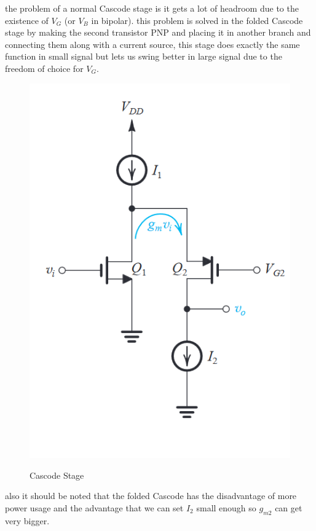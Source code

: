 \documentclass[11pt]{article}
\begin{document}
the problem of a normal Cascode stage is it gets a lot of headroom due to the existence of
$V_G$ (or $V_B$ in bipolar). this problem is solved in the folded Cascode stage by
making the second transistor PNP and placing it in another branch and connecting
them along with a current source, this stage does exactly the same function in small signal
but lets us swing better in large signal due to the freedom of choice for $V_G$. \\

\begin{figure}[H]
    \begin{center}
        \includegraphics[scale=0.8]{Fig/folded.png}
        \label{fig:THDBasic}
        \caption{Cascode Stage}
    \end{center}
\end{figure}

also it should be noted that the folded Cascode has the disadvantage of more power usage
and the advantage that we can set $I_2$ small enough so $g_{m2}$ can get very bigger. \\
\end{document}
